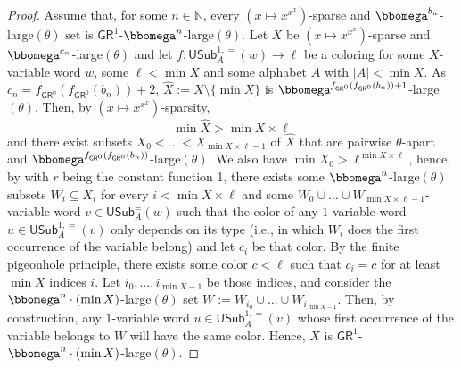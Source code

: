 \documentclass{article}
\numberwithin{theorem}{section}
\newcommand{\GR}{\mathsf{GR}}
\newcommand{\NN}{\mathbb{N}}
\newcommand{\USub}{\mathsf{USub}}
\begin{document}
\begin{proof}
Assume that, for some $n \in \NN$, every $(x \mapsto x^{x^x})$-sparse and $\bbomega^{b_n}$-large$(\theta)$ set is $\GR^1$-$\bbomega^n$-large$(\theta)$. Let $X$ be $(x \mapsto x^{x^x})$-sparse and $\bbomega^{c_n}$-large$(\theta)$ and let $f : \USub^{1,=}_A(w) \to \ell$ be a coloring for some $X$-variable word $w$, some $\ell < \min X$ and some alphabet $A$ with $|A| < \min X$. As $c_{n} = f_{\GR^0}(f_{\GR^0}(b_n)) + 2$, $\hat X := X \setminus \{\min X\}$ is $\bbomega^{f_{\GR^0}(f_{\GR^0}(b_n)) + 1}$-large$(\theta)$. Then, by $(x \mapsto x^{x^x})$-sparsity, $$\min \hat X > \min X \times \ell$$ and there exist subsets $X_0 < \dots < X_{\min X \times \ell -1}$ of $\hat X$ that are pairwise $\theta$-apart and $\bbomega^{f_{\GR^0}(f_{\GR^0}(b_n))}$-large$(\theta)$. We also have $\min X_0 > \ell^{\min X \times \ell}$, hence, by  with $r$ being the constant function 1, there exists some $\bbomega^n$-large$(\theta)$ subsets $W_i \subseteq X_i$ for every $i < \min X \times \ell$ and some $W_0 \cup \dots \cup W_{\min X \times \ell - 1}$-variable word $v \in \USub_A^=(w)$ such that the color of any $1$-variable word $u \in \USub_A^{1,=}(v)$ only depends on its type (i.e., in which $W_i$ does the first occurrence of the variable belong) and let $c_i$ be that color. By the finite pigeonhole principle, there exists some color $c < \ell$ such that $c_i = c$ for at least $\min X$ indices $i$. Let $i_0, \dots, i_{\min X - 1}$ be those indices, and consider the $\bbomega^{n}\cdot (\min X)$-large$(\theta)$ set $W := W_{i_0}\cup \dots \cup W_{i_{\min X -1}}$. Then, by construction, any $1$-variable word $u \in \USub_A^{1,=}(v)$ whose first occurrence of the variable belongs to $W$ will have the same color. Hence, $X$ is $\GR^1$-$\bbomega^{n}\cdot (\min X)$-large$(\theta)$.


\end{proof}
\end{document}
